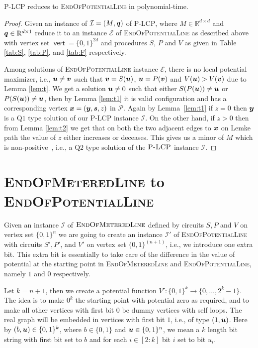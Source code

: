 \documentclass[a4paper,UKenglish]{lipics2}
\theoremstyle{definition}
\def\problem#1{\textsc{#1}}
\def\EOPL{\problem{EndOfPotentialLine}\xspace}
\def\EOML{\problem{EndOfMeteredLine}\xspace}
\def\PLCP{\problem{P-LCP}\xspace}
\def\pot{\mbox{$V$}}
\def\PLo{\mbox{Q1}}
\def\PLt{\mbox{Q2}}
\def\Real{\mathbb{R}}
\def\vert{\operatorname{\mathsf{vert}}}
\newcommand{\CPol}{\mbox{${\mathcal P}$}}
\newcommand{\CI}{\mbox{${\mathcal I}$}}
\newcommand{\CE}{\mbox{${\mathcal E}$}}
\newcommand{\yy}{\mbox{\boldmath $y$}}
\newcommand{\uu}{\mbox{\boldmath $u$}}
\newcommand{\vv}{\mbox{\boldmath $v$}}
\newcommand{\qq}{\mbox{\boldmath $q$}}
\newcommand{\xx}{\mbox{\boldmath $x$}}
\newcommand{\MM}{\mbox{$M$}}
\newcommand{\ps}{\mbox{\boldmath $s$}}
\begin{document}
\begin{theorem}
\PLCP reduces to \EOPL in polynomial-time. 
\end{theorem}
\begin{proof}
	Given an instance of $\CI=(\MM,\qq)$ of \PLCP, where $M\in \Real^{d\times d}$ and $\qq\in \Real^{d\times 1}$ reduce it to an instance $\CE$ of \EOPL as described above with vertex set $\vert=\{0,1\}^{2d}$ and procedures $S$, $P$ and $\pot$ as given in Table \ref{tab:S}, \ref{tab:P}, and \ref{tab:F} respectively.

Among solutions of \EOPL instance $\CE$, there is no local potential maximizer,
	i.e., $\uu\neq \vv$ such that $\vv=S(\uu)$, $\uu=P(\vv)$ and $\pot(\uu)>\pot(\vv)$
	due to Lemma \ref{lem:t}. We get a solution $\uu \neq 0$ such that either
	$S(P(\uu))\neq \uu$ or $P(S(\uu))\neq \uu$, then by Lemma \ref{lem:t1} it is
	valid configuration and has a corresponding vertex $\xx=(\yy,\ps,z)$ in
	$\CPol$. Again by Lemma~\ref{lem:t1} if $z=0$ then $\yy$ is a $\PLo$ type solution
	of our \PLCP instance $\CI$. On the other hand, if $z>0$ then from Lemma
	\ref{lem:t2} we get that on both the two adjacent edges to $\xx$ on Lemke
	path the value of $z$ either increases or deceases. This gives us a minor of $M$
	which is non-positive~\cite{cottle2009linear}, 
	i.e., a $\PLt$ type solution of the $\PLCP$	instance $\CI$.
\end{proof}

\newpage




\newpage
\appendix
\section{\EOML to \EOPL}
\label{sec:EOMLtoEOPL}

Given an instance $\CI$ of $\EOML$ defined by circuits $S,P$ and $V$ on vertex
set $\{0,1\}^n$ we are going to create an instance $\CI'$ of \EOPL with circuits
$S',P'$, and $V'$ on vertex set $\{0,1\}^{(n+1)}$, i.e., we introduce one extra bit.  
This extra bit is essentially to take care of the difference in the value of potential 
at the starting point in \EOML and \EOPL, namely $1$ and $0$ respectively. 

Let $k=n+1$, then we create a potential function $V':\{0,1\}^k \rightarrow
\{0,\dots,2^k-1\}$. 
The idea is to make $0^k$ the starting point with potential zero as required,
and to make all other vertices with first bit $0$ be dummy vertices with self
loops. The real graph
will be embedded in vertices with first bit $1$, i.e., of type $(1,\uu)$. Here
by $(b,\uu)\in \{0,1\}^k$, where $b\in \{0,1\}$ and $\uu\in \{0,1\}^n$, we mean
a $k$ length bit string with first bit set to $b$ and for each $i\in[2:k]$ bit $i$ 
set to bit $u_i$. %
\end{document}
